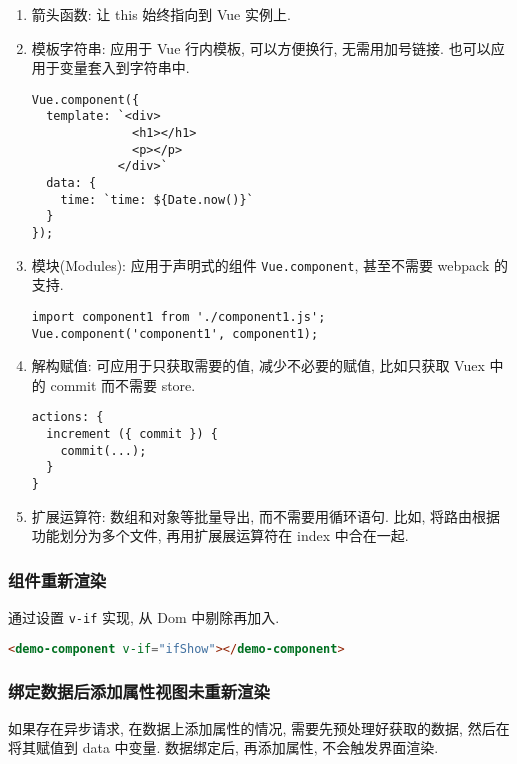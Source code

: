 \begin{enumerate}
\def\labelenumi{\arabic{enumi}.}
\item
  箭头函数: 让 this 始终指向到 Vue 实例上.
\item
  模板字符串: 应用于 Vue 行内模板, 可以方便换行, 无需用加号链接.
  也可以应用于变量套入到字符串中.

\begin{lstlisting}
Vue.component({
  template: `<div>
              <h1></h1>
              <p></p>
            </div>`
  data: {
    time: `time: ${Date.now()}`
  }
});
\end{lstlisting}
\item
  模块(Modules): 应用于声明式的组件 \lstinline!Vue.component!,
  甚至不需要 webpack 的支持.

\begin{lstlisting}
import component1 from './component1.js';
Vue.component('component1', component1);
\end{lstlisting}
\item
  解构赋值: 可应用于只获取需要的值, 减少不必要的赋值, 比如只获取 Vuex
  中的 commit 而不需要 store.

\begin{lstlisting}
actions: {
  increment ({ commit }) {
    commit(...);
  }
}
\end{lstlisting}
\item
  扩展运算符: 数组和对象等批量导出, 而不需要用循环语句. 比如,
  将路由根据功能划分为多个文件, 再用扩展展运算符在 index 中合在一起.
\end{enumerate}

\subsubsection{组件重新渲染}\label{ux7ec4ux4ef6ux91cdux65b0ux6e32ux67d3}

通过设置 \lstinline!v-if! 实现, 从 Dom 中剔除再加入.

\begin{lstlisting}[language=HTML]
<demo-component v-if="ifShow"></demo-component>
\end{lstlisting}

\subsubsection{绑定数据后添加属性视图未重新渲染}\label{ux7ed1ux5b9aux6570ux636eux540eux6dfbux52a0ux5c5eux6027ux89c6ux56feux672aux91cdux65b0ux6e32ux67d3}

如果存在异步请求, 在数据上添加属性的情况, 需要先预处理好获取的数据,
然后在将其赋值到 data 中变量. 数据绑定后, 再添加属性, 不会触发界面渲染.

